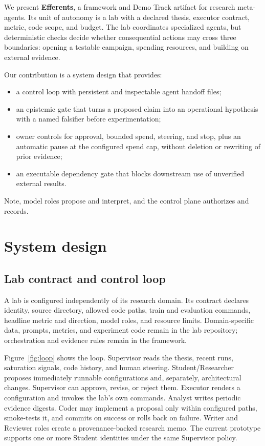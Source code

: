 \documentclass{article}
\begin{document}
We present \textbf{Efferents}, a framework and Demo Track artifact for research meta-agents. Its unit of autonomy is a lab with a declared thesis, executor contract, metric, code scope, and budget. The lab coordinates specialized agents, but deterministic checks decide whether consequential actions may cross three boundaries: opening a testable campaign, spending resources, and building on external evidence.

Our contribution is a system design that provides:

\begin{itemize}[leftmargin=*,nosep]
  \item a control loop with persistent and inspectable agent handoff files;
  \item an epistemic gate that turns a proposed claim into an operational hypothesis with a named falsifier before experimentation;
  \item owner controls for approval, bounded spend, steering, and stop, plus an automatic pause at the configured spend cap, without deletion or rewriting of prior evidence;
  \item an executable dependency gate that blocks downstream use of unverified external results.
\end{itemize}

Note, model roles propose and interpret, and the control plane authorizes and records.

\section{System design}

\subsection{Lab contract and control loop}

A lab is configured independently of its research domain. Its contract declares identity, source directory, allowed code paths, train and evaluation commands, headline metric and direction, model roles, and resource limits. Domain-specific data, prompts, metrics, and experiment code remain in the lab repository; orchestration and evidence rules remain in the framework.

Figure~\ref{fig:loop} shows the loop. Supervisor reads the thesis, recent runs, saturation signals, code history, and human steering. Student/Researcher proposes immediately runnable configurations and, separately, architectural changes. Supervisor can approve, revise, or reject them. Executor renders a configuration and invokes the lab's own commands. Analyst writes periodic evidence digests. Coder may implement a proposal only within configured paths, smoke-tests it, and commits on success or rolls back on failure. Writer and Reviewer roles create a provenance-backed research memo. The current prototype supports one or more Student identities under the same Supervisor policy.
\end{document}
